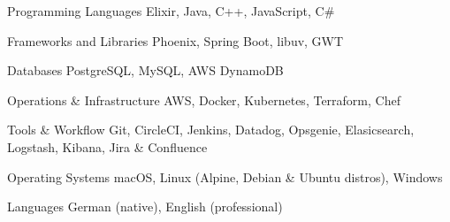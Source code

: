 

\begin{cvskills}

  \cvskill
    {Programming Languages} %
    {Elixir, Java, C++, JavaScript, C\#} %
  
  \cvskill
    {Frameworks and Libraries} %
    {Phoenix, Spring Boot, libuv, GWT} %
  
  \cvskill
    {Databases} %
    {PostgreSQL, MySQL, AWS DynamoDB} %

  \cvskill
    {Operations \& Infrastructure} %
    {AWS, Docker, Kubernetes, Terraform, Chef} %

  \cvskill
    {Tools \& Workflow} %
    {Git, CircleCI, Jenkins, Datadog, Opsgenie, Elasicsearch, Logstash, Kibana, Jira \& Confluence} %

  \cvskill
    {Operating Systems} %
    {macOS, Linux (Alpine, Debian \& Ubuntu distros), Windows} %

  \cvskill
    {Languages} %
    {German (native), English (professional)} %

\end{cvskills}

